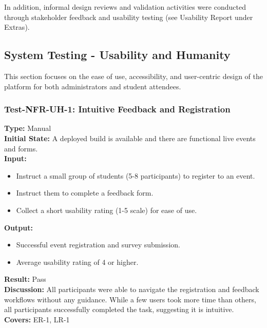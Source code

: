 \documentclass[12pt, titlepage]{article}
\begin{document}
In addition, informal design reviews and validation activities were conducted through stakeholder feedback and usability testing (see Usability Report under Extras).

\subsection{System Testing - Usability and Humanity}
This section focuses on the ease of use, accessibility, and user-centric design of the platform for both administrators and student attendees.

\subsubsection{Test-NFR-UH-1: Intuitive Feedback and Registration}
\textbf{Type:} Manual \\
\textbf{Initial State:} A deployed build is available and there are functional live events and forms. \\
\textbf{Input:}
\begin{itemize}
    \item Instruct a small group of students (5-8 participants) to register to an event.
    \item Instruct them to complete a feedback form.
    \item Collect a short usability rating (1-5 scale) for ease of use.
\end{itemize}
\textbf{Output:}
\begin{itemize}
    \item Successful event registration and survey submission.
    \item Average usability rating of 4 or higher.
\end{itemize}
\textbf{Result:} Pass \\
\textbf{Discussion:} All participants were able to navigate the registration and feedback workflows without any guidance. While a few users took more time than others, all participants successfully completed the task, suggesting it is intuitive.
\textbf{Covers:} ER-1, LR-1 \\
\end{document}
